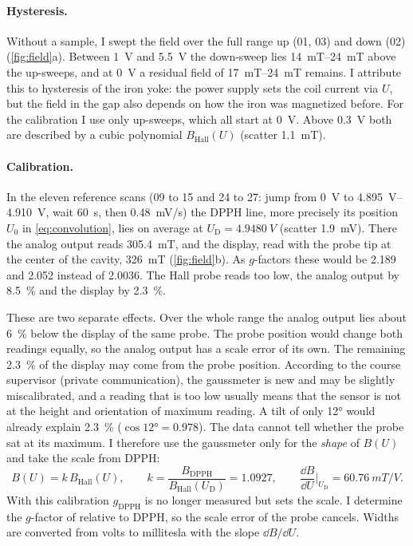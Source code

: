 \paragraph{Hysteresis.}
Without a sample, I swept the field over the full range up (01, 03) and down (02) (\cref{fig:field}a). Between
\qty{1}{V} and \qty{5.5}{V} the down-sweep lies \qtyrange{14}{24}{mT} above the up-sweeps, and at \qty{0}{V} a residual
field of \qtyrange{17}{24}{mT} remains. I attribute this to hysteresis of the iron yoke: the power supply sets the coil current
via $U$, but the field in the gap also depends on how the iron was magnetized before. For the calibration I use
only up-sweeps, which all start at \qty{0}{V}. Above \qty{0.3}{V} both are described by a cubic polynomial
$B_\text{Hall}(U)$ (scatter \qty{1.1}{mT}).

\paragraph{Calibration.}
In the eleven reference scans (09 to 15 and 24 to 27: jump from \qty{0}{V} to \qtyrange{4.895}{4.910}{V}, wait
\qty{60}{s}, then \qty{0.48}{mV/s}) the DPPH line, more precisely its position $U_0$ in \cref{eq:convolution}, lies on average
at $U_\text{D}=\qty{4.9480}{V}$ (scatter \qty{1.9}{mV}). There the analog output reads \qty{305.4}{mT}, and the display,
read with the probe tip at the center of the cavity, \qty{326}{mT} (\cref{fig:field}b). As $g$-factors these would be
\num{2.189} and \num{2.052} instead of \num{2.0036}. The Hall probe reads too low, the analog output by
\qty{8.5}{\percent} and the display by \qty{2.3}{\percent}.

These are two separate effects. Over the whole range the analog output lies about \qty{6}{\percent} below the display of
the same probe. The probe position would change both readings equally, so the analog output has a scale error of its
own. The remaining \qty{2.3}{\percent} of the display may come from the probe position. According to the course
supervisor (private communication), the gaussmeter is new and may be slightly miscalibrated, and a reading that is too
low usually means that the sensor is not at the height and orientation of maximum reading. A tilt of only \ang{12}
would already explain \qty{2.3}{\percent} ($\cos\ang{12}=\num{0.978}$). The data cannot tell whether the probe sat at its
maximum. I therefore use the gaussmeter only for the \emph{shape} of $B(U)$ and take the scale from DPPH:
\begin{equation}\label{eq:fieldscale}
  B(U)=k\,B_\text{Hall}(U),\qquad k=\frac{B_\text{DPPH}}{B_\text{Hall}(U_\text{D})}=\num{1.0927},
  \qquad \frac{\dd B}{\dd U}\Big|_{U_\text{D}}=\qty{60.76}{mT/V}.
\end{equation}
With this calibration $g_\text{DPPH}$ is no longer measured but sets the scale. I determine the $g$-factor of 
relative to DPPH, so the scale error of the probe cancels. Widths are converted from volts to millitesla with the slope
$\dd B/\dd U$.

